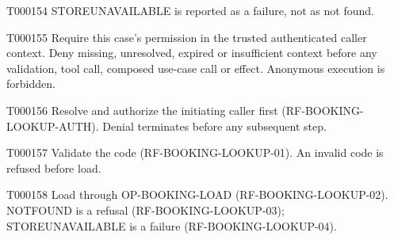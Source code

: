 \documentclass[11pt,a4paper]{article}
\begin{document}
\begin{atlasparagraph}{T000154}
STORE\AtlasCharUnderscore{}UNAVAILABLE is reported as a failure, not as not found.
\end{atlasparagraph}
\begin{atlasparagraph}{T000155}
Require this case's permission in the trusted authenticated caller context. Deny missing, unresolved, expired or insufficient context before any validation, tool call, composed use-case call or effect. Anonymous execution is forbidden.
\end{atlasparagraph}
\begin{atlasparagraph}{T000156}
Resolve and authorize the initiating caller first (RF-BOOKING-LOOKUP-AUTH). Denial terminates before any subsequent step.
\end{atlasparagraph}
\begin{atlasparagraph}{T000157}
Validate the code (RF-BOOKING-LOOKUP-01). An invalid code is refused before load.
\end{atlasparagraph}
\begin{atlasparagraph}{T000158}
Load through OP-BOOKING-LOAD (RF-BOOKING-LOOKUP-02). NOT\AtlasCharUnderscore{}FOUND is a refusal (RF-BOOKING-LOOKUP-03); STORE\AtlasCharUnderscore{}UNAVAILABLE is a failure (RF-BOOKING-LOOKUP-04).
\end{atlasparagraph}
\end{document}
